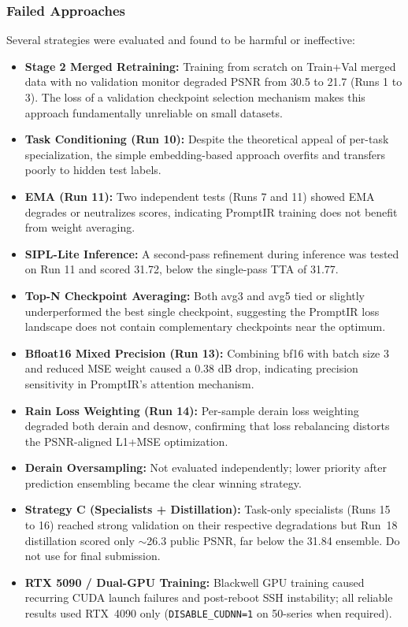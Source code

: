 \documentclass[12pt, a4paper]{article}
\begin{document}
\subsubsection{Failed Approaches}
Several strategies were evaluated and found to be harmful or ineffective:
\begin{itemize}
    \item \textbf{Stage 2 Merged Retraining:} Training from scratch on Train+Val merged data with no validation monitor degraded PSNR from 30.5 to 21.7 (Runs 1 to 3). The loss of a validation checkpoint selection mechanism makes this approach fundamentally unreliable on small datasets.
    \item \textbf{Task Conditioning (Run 10):} Despite the theoretical appeal of per-task specialization, the simple embedding-based approach overfits and transfers poorly to hidden test labels.
    \item \textbf{EMA (Run 11):} Two independent tests (Runs 7 and 11) showed EMA degrades or neutralizes scores, indicating PromptIR training does not benefit from weight averaging.
    \item \textbf{SIPL-Lite Inference:} A second-pass refinement during inference was tested on Run 11 and scored 31.72, below the single-pass TTA of 31.77.
    \item \textbf{Top-N Checkpoint Averaging:} Both avg3 and avg5 tied or slightly underperformed the best single checkpoint, suggesting the PromptIR loss landscape does not contain complementary checkpoints near the optimum.
    \item \textbf{Bfloat16 Mixed Precision (Run 13):} Combining bf16 with batch size 3 and reduced MSE weight caused a 0.38 dB drop, indicating precision sensitivity in PromptIR's attention mechanism.
    \item \textbf{Rain Loss Weighting (Run 14):} Per-sample derain loss weighting degraded both derain and desnow, confirming that loss rebalancing distorts the PSNR-aligned L1+MSE optimization.
    \item \textbf{Derain Oversampling:} Not evaluated independently; lower priority after prediction ensembling became the clear winning strategy.
    \item \textbf{Strategy C (Specialists + Distillation):} Task-only specialists (Runs 15 to 16) reached strong validation on their respective degradations but Run~18 distillation scored only $\sim$26.3 public PSNR, far below the 31.84 ensemble. Do not use for final submission.
    \item \textbf{RTX 5090 / Dual-GPU Training:} Blackwell GPU training caused recurring CUDA launch failures and post-reboot SSH instability; all reliable results used RTX~4090 only (\texttt{DISABLE\_CUDNN=1} on 50-series when required).
\end{itemize}
\end{document}
